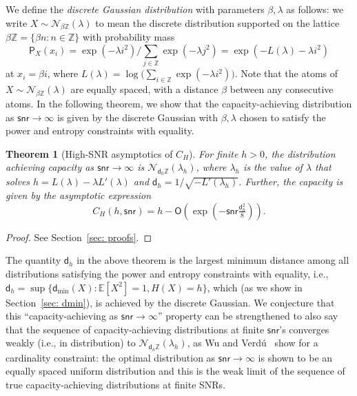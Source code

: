 \documentclass[11pt]{article}
\newcommand{\calNdisc}[1]{\mathcal{N}_{#1 \bbZ}}
\renewcommand{\O}{\mathsf{O}}
\newcommand{\snr}{\mathsf{snr}}
\newcommand{\probP}{\mathsf{P}}
\newcommand{\bbE}{\mathbb{E}}
\newcommand{\bbZ}{\mathbb{Z}}
\newcommand{\dmin}{\mathsf{d}_{\min}}
\newcommand{\dist}{\mathsf{d}}
\newtheorem{theorem}{Theorem}
\begin{document}
	We define the \emph{discrete Gaussian distribution} with parameters $\beta,\lambda$ as follows: we write $X \sim \calNdisc{\beta}(\lambda)$ to mean the discrete distribution supported on the lattice $\beta \bbZ = \{\beta n : n \in \bbZ\}$ with probability mass
	\begin{equation*}
		\probP_{X}(x_i) = \exp(-\lambda i^2) / \sum_{j \in \bbZ} \exp(-\lambda j^2) = \exp(-L(\lambda)-\lambda i^2) 
	\end{equation*}
	at $x_i = \beta i$, where $L(\lambda) = \log\big(\sum_{i \in \bbZ} \exp(-\lambda i^2)\big)$.  Note that the atoms of $X \sim \calNdisc{\beta}(\lambda)$ are equally spaced, with a distance $\beta$ between any consecutive atoms. In the following theorem, we show that the capacity-achieving distribution as $\snr \to \infty$ is given by the discrete Gaussian with $\beta,\lambda$ chosen to satisfy the power and entropy constraints with equality.
	
	\begin{theorem}[High-SNR asymptotics of $C_H$] 
		For finite $h > 0$, the distribution achieving capacity as $\snr \to \infty$ is $\calNdisc{\dist_h}(\lambda_h)$, where $\lambda_h$ is the 
		value of $\lambda$ that solves $h = L(\lambda) - \lambda L'(\lambda)$ and $\dist_h = 1/\sqrt{-L'(\lambda_h)}$.
		Further, the capacity is given by the asymptotic expression 
		\begin{equation}
			C_H(h, \snr) = h - \O\left(\exp\left( - \snr\tfrac{\dist_h^2}{8}  \right)\right). \label{eqn: gap_char}
		\end{equation} 
		\label{thm: char}
	\end{theorem}
	\begin{proof}
		See Section~\ref{sec: proofs}.
	\end{proof}
	
	The quantity $\dist_h$ in the above theorem is the largest minimum distance among all distributions satisfying the power and entropy constraints with equality, i.e., $\dist_h = \sup \{\dmin(X) : \bbE[X^2] = 1, H(X) = h\}$, which (as we show in Section~\ref{sec: dmin}), is achieved by the discrete Gaussian.
	We conjecture that this ``capacity-achieving as $\snr \to \infty$'' property can be strengthened to also say  that the sequence of capacity-achieving distributions at finite $\snr$'s converges weakly (i.e., in distribution) to $\calNdisc{\dist_h}(\lambda_h)$, as Wu and Verd\'u~\cite{wu2010impact} show for a cardinality constraint:  the optimal distribution as $\snr \to \infty$ is shown to be an equally spaced uniform distribution and this is the weak limit of the sequence of true capacity-achieving distributions at finite SNRs. 
	
\end{document}
